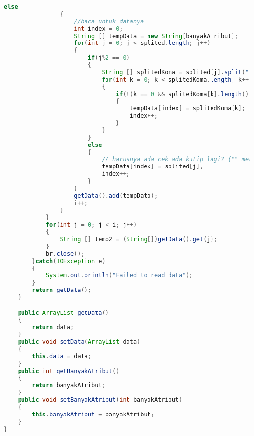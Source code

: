 \begin{lstlisting}[language=Java,basicstyle=\tiny,caption=CSVReader.java]
                else
                {
                    //baca untuk datanya
                    int index = 0;
                    String [] tempData = new String[banyakAtribut];
                    for(int j = 0; j < splited.length; j++)
                    {
                        if(j%2 == 0)
                        {
                            String [] splitedKoma = splited[j].split(",");
                            for(int k = 0; k < splitedKoma.length; k++)
                            {
                                if(!(k == 0 && splitedKoma[k].length() ==0)||(k==splitedKoma.length-1 && splitedKoma[k].length() == 0))
                                {
                                    tempData[index] = splitedKoma[k];
                                    index++;
                                }
                            }
                        }
                        else
                        {
                            // harusnya ada cek ada kutip lagi? ("" merupakan " biasa)
                            tempData[index] = splited[j];
                            index++;
                        }
                    }
                    getData().add(tempData);
                    i++;
                }
            }
            for(int j = 0; j < i; j++)
            {
                String [] temp2 = (String[])getData().get(j);
            }
            br.close();
        }catch(IOException e)
        {
            System.out.println("Failed to read data");
        }
        return getData();
    }

    public ArrayList getData()
    {
        return data;
    }
    public void setData(ArrayList data)
    {
        this.data = data;
    }
    public int getBanyakAtribut()
    {
        return banyakAtribut;
    }
    public void setBanyakAtribut(int banyakAtribut)
    {
        this.banyakAtribut = banyakAtribut;
    }
}
\end{lstlisting}

